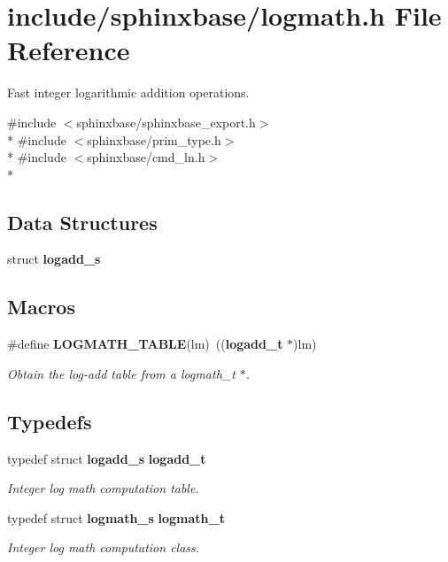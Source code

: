 \section{include/sphinxbase/logmath.h File Reference}
\label{logmath_8h}


Fast integer logarithmic addition operations.  


{\ttfamily \#include $<$sphinxbase/sphinxbase\-\_\-export.\-h$>$}\\*
{\ttfamily \#include $<$sphinxbase/prim\-\_\-type.\-h$>$}\\*
{\ttfamily \#include $<$sphinxbase/cmd\-\_\-ln.\-h$>$}\\*
\subsection*{Data Structures}
\begin{DoxyCompactItemize}
\item 
struct {\bf logadd\-\_\-s}
\end{DoxyCompactItemize}
\subsection*{Macros}
\begin{DoxyCompactItemize}
\item 
\#define {\bf L\-O\-G\-M\-A\-T\-H\-\_\-\-T\-A\-B\-L\-E}(lm)~(({\bf logadd\-\_\-t} $\ast$)lm)\label{logmath_8h_ae5c5ce106e9f8f1e763d419de53317a8}

\begin{DoxyCompactList}\small\item\em Obtain the log-\/add table from a logmath\-\_\-t $\ast$. \end{DoxyCompactList}\end{DoxyCompactItemize}
\subsection*{Typedefs}
\begin{DoxyCompactItemize}
\item 
typedef struct {\bf logadd\-\_\-s} {\bf logadd\-\_\-t}
\begin{DoxyCompactList}\small\item\em Integer log math computation table. \end{DoxyCompactList}\item 
typedef struct {\bf logmath\-\_\-s} {\bf logmath\-\_\-t}\label{logmath_8h_ae613aa7db1dd40ff56a80a7dadb22cc8}

\begin{DoxyCompactList}\small\item\em Integer log math computation class. \end{DoxyCompactList}\end{DoxyCompactItemize}
